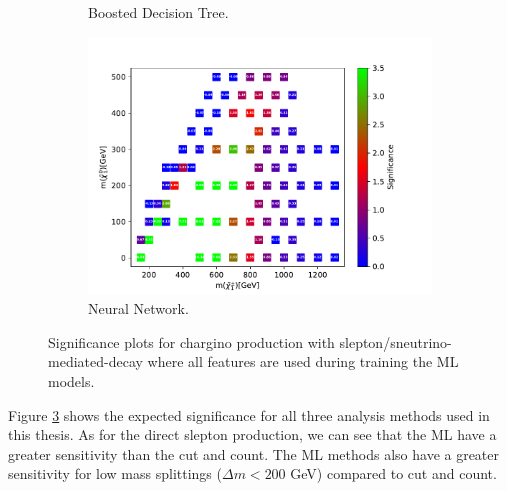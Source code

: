 \begin{figure}[H]
\begin{subfigure}[t!]{0.49\textwidth}
    \caption{Boosted Decision Tree.}
        \label{fig:signAllslepsnuBDT}
    \end{subfigure}      
    \begin{subfigure}[t!]{0.49\textwidth}
    \includegraphics[width = \textwidth]{Figures/Significances/significance_NN_slepsnu_All_level.pdf}
    \caption{Neural Network.}
        \label{fig:signAllslepsnuNN}
    \end{subfigure}
    \caption{Significance plots for chargino production with slepton/sneutrino-mediated-decay where all features are used during training the ML models.}
    \label{fig:signAllslepsnu}
\end{figure}

Figure \ref{fig:signAllslepsnu} shows the expected significance for all three analysis methods used in this thesis. As for the direct slepton production, we can see that the ML have a greater sensitivity than the cut and count. The ML methods also have a greater sensitivity for low mass splittings ($\Delta m < 200$ GeV) compared to cut and count. 





























